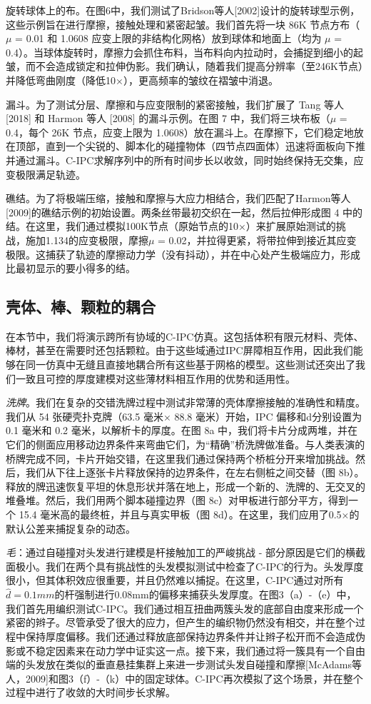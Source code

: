 旋转球体上的布。在图6中，我们测试了Bridson等人[2002]设计的旋转球型示例，这些示例旨在进行摩擦，接触处理和紧密起皱。我们首先将一块 86K 节点方布（$\mu$ = 0.01 和 1.0608 应变上限的非结构化网格）放到球体和地面上（均为 $\mu$ = 0.4）。当球体旋转时，摩擦力会抓住布料，当布料向内拉动时，会捕捉到细小的起皱，而不会造成锁定和拉伸伪影。我们确认，随着我们提高分辨率（至246K节点）并降低弯曲刚度（降低10×），更高频率的皱纹在褶皱中消退。

漏斗。为了测试分层、摩擦和与应变限制的紧密接触，我们扩展了 Tang 等人 [2018] 和 Harmon 等人 [2008] 的漏斗示例。在图 7 中，我们将三块布板（$\mu$ = 0.4，每个 26K 节点，应变上限为 1.0608）放在漏斗上。在摩擦下，它们稳定地放在顶部，直到一个尖锐的、脚本化的碰撞物体（四节点四面体）迅速将面板向下推并通过漏斗。C-IPC求解序列中的所有时间步长以收敛，同时始终保持无交集，应变极限满足轨迹。

礁结。为了将极端压缩，接触和摩擦与大应力相结合，我们匹配了Harmon等人[2009]的礁结示例的初始设置。两条丝带最初交织在一起，然后拉伸形成图 4 中的结。在这里，我们通过模拟100K节点（原始节点的10×）来扩展原始测试的挑战，施加1.134的应变极限，摩擦$\mu$ = 0.02，并拉得更紧，将带拉伸到接近其应变极限。这捕获了轨迹的摩擦动力学（没有抖动），并在中心处产生极端应力，形成比最初显示的要小得多的结。

\subsection{壳体、棒、颗粒的耦合}

在本节中，我们将演示跨所有协域的C-IPC仿真。这包括体积有限元材料、壳体、棒材，甚至在需要时还包括颗粒。由于这些域通过IPC屏障相互作用，因此我们能够在同一仿真中无缝且直接地耦合所有这些基于网格的模型。这些测试还突出了我们一致且可控的厚度建模对这些薄材料相互作用的优势和适用性。

\textit{洗牌}。我们在复杂的交错洗牌过程中测试非常薄的壳体摩擦接触的准确性和精度。我们从 54 张硬壳扑克牌（63.5 毫米× 88.8 毫米）开始，IPC 偏移和d分别设置为 0.1 毫米和 0.2 毫米，以解析卡的厚度。在图 8a 中，我们将卡片分成两堆，并在它们的侧面应用移动边界条件来弯曲它们，为“精确”桥洗牌做准备。与人类表演的桥牌完成不同，卡片开始交错，在这里我们通过保持两个桥桩分开来增加挑战。然后，我们从下往上逐张卡片释放保持的边界条件，在左右侧桩之间交替（图 8b）。释放的牌迅速恢复平坦的休息形状并落在地上，形成一个新的、洗牌的、无交叉的堆叠堆。然后，我们用两个脚本碰撞边界（图 8c）对甲板进行部分平方，得到一个 15.4 毫米高的最终桩，并且与真实甲板（图 8d）。在这里，我们应用了0.5×的默认公差来捕捉复杂的动态。

\textit{毛}：通过自碰撞对头发进行建模是杆接触加工的严峻挑战 - 部分原因是它们的横截面极小。我们在两个具有挑战性的头发模拟测试中检查了C-IPC的行为。头发厚度很小，但其体积效应很重要，并且仍然难以捕捉。在这里，C-IPC通过对所有$\hat d = 0.1mm$的杆强制进行0.08mm的偏移来捕获头发厚度。在图3（a）-（e）中，我们首先用编织测试C-IPC。我们通过相互扭曲两簇头发的底部自由度来形成一个紧密的辫子。尽管承受了很大的应力，但产生的编织物仍然没有相交，并在整个过程中保持厚度偏移。我们还通过释放底部保持边界条件并让辫子松开而不会造成伪影或不稳定因素来在动力学中证实这一点。接下来，我们通过将一簇具有一个自由端的头发放在类似的垂直悬挂集群上来进一步测试头发自碰撞和摩擦[McAdams等人，2009]和图3（f）-（k）中的固定球体。C-IPC再次模拟了这个场景，并在整个过程中进行了收敛的大时间步长求解。

